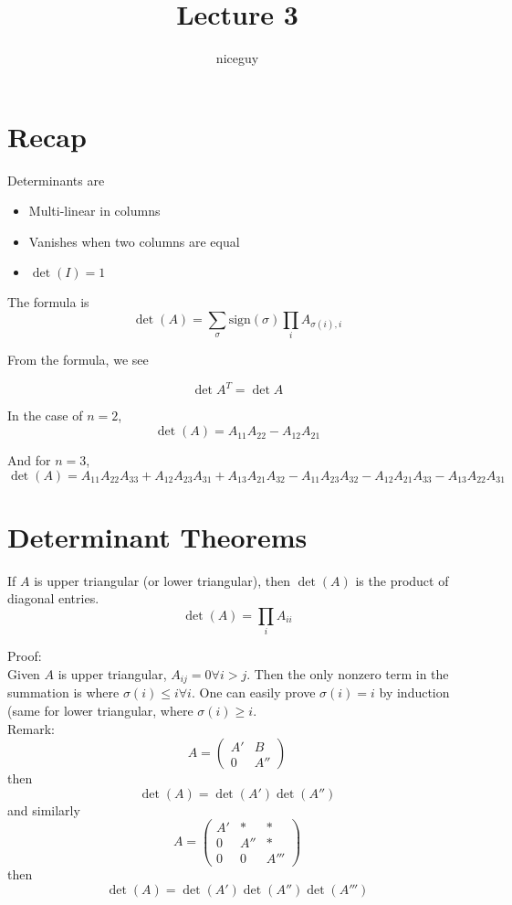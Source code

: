 \documentclass[12pt]{article}
\author{niceguy}
\title{Lecture 3}
\begin{document}
\maketitle

\section{Recap}

Determinants are

\begin{itemize}
	\item Multi-linear in columns \\
	\item Vanishes when two columns are equal \\
	\item $\det(I) = 1$
\end{itemize}

The formula is
$$\det(A) = \sum_\sigma \text{sign}(\sigma) \prod_i A_{\sigma(i),i}$$

From the formula, we see

$$\det{A^T} = \det{A}$$

In the case of $n=2$,
$$\det(A) = A_{11}A_{22} - A_{12}A_{21}$$

And for $n=3$,
$$\det(A) = A_{11}A_{22}A_{33} + A_{12}A_{23}A_{31} + A_{13}A_{21}A_{32} - A_{11}A_{23}A_{32} - A_{12}A_{21}A_{33} - A_{13}A_{22}A_{31}$$

\section{Determinant Theorems}

\begin{thm}
	If $A$ is upper triangular (or lower triangular), then $\det(A)$ is the product of diagonal entries.
	$$\det(A) = \prod_i A_{ii}$$
\end{thm}

Proof: \\
Given $A$ is upper triangular, $A_{ij} = 0 \forall i>j$. Then the only nonzero term in the summation is where $\sigma(i)\leq i\forall i$. One can easily prove $\sigma(i)=i$ by induction (same for lower triangular, where $\sigma(i)\geq i$. \\
Remark: \\
$$A=\begin{pmatrix} A' & B \\ 0 & A''\end{pmatrix}$$
then
$$\det(A) = \det(A')\det(A'')$$
and similarly
$$A=\begin{pmatrix} A'& * & *\\ 0 & A'' & * \\ 0 & 0 & A'''\end{pmatrix}$$
then
$$\det(A) = \det(A')\det(A'')\det(A''')$$
\end{document}

